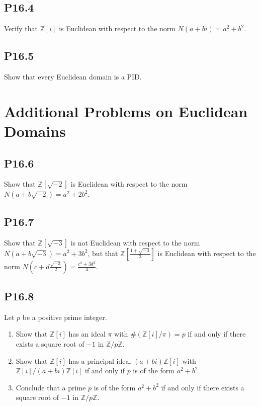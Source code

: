 \documentclass[lang=cn,11pt]{template}
\begin{document}
\subsection*{P16.4} Verify that \( \mathbb{Z}[i] \) is Euclidean with respect to the norm \( N(a + bi) = a^2 + b^2 \).

\subsection*{P16.5} Show that every Euclidean domain is a PID.

\section{Additional Problems on Euclidean Domains}

\subsection*{P16.6} Show that \( \mathbb{Z}[\sqrt{-2}] \) is Euclidean with respect to the norm \( N(a + b\sqrt{-2}) = a^2 + 2b^2 \).

\subsection*{P16.7} Show that \( \mathbb{Z}[\sqrt{-3}] \) is not Euclidean with respect to the norm \( N(a + b\sqrt{-3}) = a^2 + 3b^2 \), but that \( \mathbb{Z}\left[\frac{1 + \sqrt{-3}}{2}\right] \) is Euclidean with respect to the norm \( N\left(c + d \frac{\sqrt{-3}}{2}\right) = \frac{c^2 + 3d^2}{4} \).

\subsection*{P16.8} Let \( p \) be a positive prime integer.
\begin{enumerate}
    \item Show that \( \mathbb{Z}[i] \) has an ideal \( \pi \) with \( \#(\mathbb{Z}[i]/\pi) = p \) if and only if there exists a square root of \( -1 \) in \( \mathbb{Z}/p\mathbb{Z} \).
    \item Show that \( \mathbb{Z}[i] \) has a principal ideal \( (a + bi)\mathbb{Z}[i] \) with \( \mathbb{Z}[i]/(a + bi)\mathbb{Z}[i] \) if and only if \( p \) is of the form \( a^2 + b^2 \).
    \item Conclude that a prime \( p \) is of the form \( a^2 + b^2 \) if and only if there exists a square root of \( -1 \) in \( \mathbb{Z}/p\mathbb{Z} \).
\end{enumerate}
\end{document}
